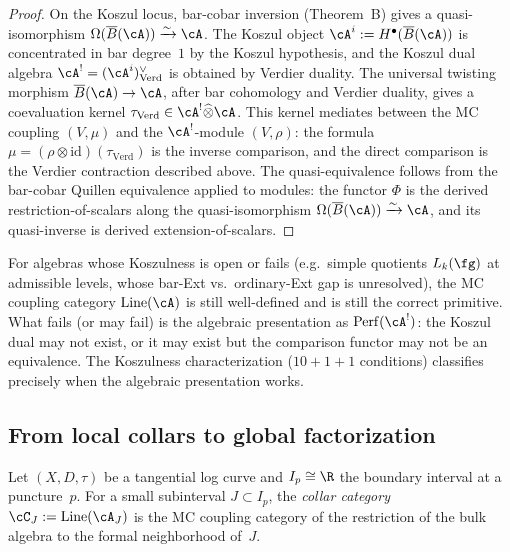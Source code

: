 \begin{proof}
On the Koszul locus, bar-cobar inversion
(Theorem~B) gives a quasi-isomorphism
$\Omega(\barB(\cA)) \xrightarrow{\sim} \cA$. The Koszul object
$\cA^{i} := H^\bullet(\barB(\cA))$ is concentrated in bar
degree~$1$ by the Koszul hypothesis, and the Koszul dual algebra
$\cA^! = (\cA^{i})^\vee_{\mathrm{Verd}}$ is obtained by Verdier
duality. The universal twisting morphism $\barB(\cA)\to\cA$, after
bar cohomology and Verdier duality, gives a coevaluation kernel
$\tau_{\mathrm{Verd}}\in\cA^!\widehat\otimes\cA$. This kernel mediates
between the MC coupling $(V,\mu)$ and the $\cA^!$-module $(V,\rho)$:
the formula $\mu=(\rho\otimes\mathrm{id})(\tau_{\mathrm{Verd}})$ is
the inverse comparison, and the direct comparison is the Verdier
contraction described above.
The quasi-equivalence follows from the bar-cobar Quillen
equivalence applied to modules: the functor $\Phi$ is the derived
restriction-of-scalars along the quasi-isomorphism
$\Omega(\barB(\cA)) \xrightarrow{\sim} \cA$, and its quasi-inverse
is derived extension-of-scalars.
\end{proof}

\begin{remark}
\label{rem:off-koszul-locus}
For algebras whose Koszulness is open or fails
\textup{(}e.g.\ simple quotients $L_k(\fg)$ at admissible levels,
whose bar-Ext vs.\ ordinary-Ext gap is unresolved\textup{)},
the MC coupling category $\operatorname{Line}(\cA)$ is still
well-defined and is still the correct primitive. What fails
\textup{(}or may fail\textup{)} is the algebraic presentation
as $\Perf(\cA^!)$: the Koszul dual may not exist, or it may
exist but the comparison functor may not be an equivalence.
The Koszulness characterization
\textup{(}$10{+}1{+}1$ conditions\textup{)} classifies precisely
when the algebraic presentation works.
\end{remark}

\subsection{From local collars to global factorization}
\label{subsec:local-to-global-factorization}

\begin{construction}
\label{constr:local-collar-categories}
Let $(X, D, \tau)$ be a tangential log curve and
$I_p \cong \R$ the boundary interval at a puncture~$p$.
For a small subinterval $J \subset I_p$, the \emph{collar category}
$\cC_J := \operatorname{Line}(\cA_J)$
is the MC coupling category of the restriction of the bulk algebra
to the formal neighborhood of~$J$.
\end{construction}

